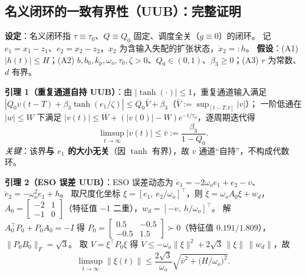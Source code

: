 \documentclass[11pt,a4paper]{article}
\theoremstyle{remark}\newtheorem{remark}{注}
\begin{document}
\subsection{名义闭环的一致有界性（UUB）：完整证明}\label{sec:uub}
\textbf{设定}：名义闭环指 $\tau\equiv\tau_0$、$Q\equiv Q_0$ 固定、调度全关（$g\equiv0$）的闭环。
记 $e_1=x_1-z_1$、$e_2=x_2-z_2$，$x_2$ 为含输入失配的扩张状态，$\dot x_2=:h$。
\textbf{假设}：(A1) $|h(t)|\le H$；(A2) $b,b_0,k_p,\omega_o,\tau_0,\zeta>0$、$Q_0\in(0,1)$、$\beta_3\ge0$；(A3) $r$ 为常数、$d$ 有界。

\noindent\textbf{引理 1（重复通道自持 UUB）}：由 $|\tanh(\cdot)|\le1$，重复通道输入满足
$|Q_0v(t-T)+\beta_3\tanh(e_1/\zeta)|\le Q_0\bar V+\beta_3$（$\bar V:=\sup_{[t-T,t]}|v|$）；
一阶低通在 $|w|\le W$ 下满足 $|v(t)|\le W+(|v(0)|-W)e^{-t/\tau_0}$，逐周期迭代得
\begin{equation}
\limsup_{t\to\infty}|v(t)|\le\bar v:=\frac{\beta_3}{1-Q_0}.
\label{eq:uub-v}
\end{equation}
\emph{关键}：该界\textbf{与 $e_1$ 的大小无关}（因 $\tanh$ 有界），故 $v$ 通道“自持”，不构成代数环。

\noindent\textbf{引理 2（ESO 误差 UUB）}：ESO 误差动态为 $\dot e_1=-2\omega_o e_1+e_2-v$、$\dot e_2=-\omega_o^{2}e_1+h$。
取尺度化坐标 $\xi=[e_1,\ e_2/\omega_o]^{\!\top}$，则 $\dot\xi=\omega_o A_0\xi+w_d$，
$A_0=\left[\begin{smallmatrix}-2&1\\-1&0\end{smallmatrix}\right]$（特征值 $-1$ 二重），$w_d=[-v,\ h/\omega_o]^{\!\top}$。
解 $A_0^{\!\top}P_0+P_0A_0=-I$ 得 $P_0=\left[\begin{smallmatrix}0.5&-0.5\\-0.5&1.5\end{smallmatrix}\right]\succ0$（特征值 $0.191/1.809$），$\|P_0B_0\|_F=\sqrt3$。
取 $V=\xi^{\!\top}P_0\xi$ 得 $\dot V\le-\omega_o\|\xi\|^{2}+2\sqrt3\,\|\xi\|\,\|w_d\|$，故
\begin{equation}
\limsup_{t\to\infty}\|\xi(t)\|\le\frac{2\sqrt3}{\omega_o}\sqrt{\bar v^{2}+\bigl(H/\omega_o\bigr)^{2}} .
\label{eq:uub-eso}
\end{equation}
\end{document}
